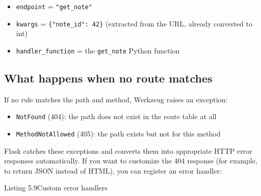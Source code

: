 \begin{itemize}
\tightlist
\item
  \texttt{endpoint} = \texttt{"get\_note"}
\item
  \texttt{kwargs} = \texttt{\{"note\_id":\ 42\}} (extracted from the URL, already converted to int)
\item
  \texttt{handler\_function} = the \texttt{get\_note} Python function
\end{itemize}

\subsection*{What happens when no route matches}\label{05-internal-request-execution:what-happens-when-no-route-matches}

If no rule matches the path and method, Werkzeug raises an exception:

\begin{itemize}
\tightlist
\item
  \texttt{NotFound} (404): the path does not exist in the route table at all
\item
  \texttt{MethodNotAllowed} (405): the path exists but not for this method
\end{itemize}

\noindent{}Flask catches these exceptions and converts them into appropriate HTTP error responses automatically. If you want to customize the 404 response (for example, to return JSON instead of HTML), you can register an error handler:

\begin{codeboxcap}[short]{\textcolor{accent}{Listing 5.9}\enspace Custom error handlers}

\begin{Shaded}
\begin{Highlighting}[]
\NormalTok{(}\NormalTok{)}
    \NormalTok{: }\NormalTok{\}), }

\NormalTok{(}\NormalTok{)}
    \NormalTok{: }\NormalTok{\}), }

\NormalTok{(}\NormalTok{)}
    \NormalTok{: }\NormalTok{\}), }
\end{Highlighting}
\end{Shaded}

\end{codeboxcap}

